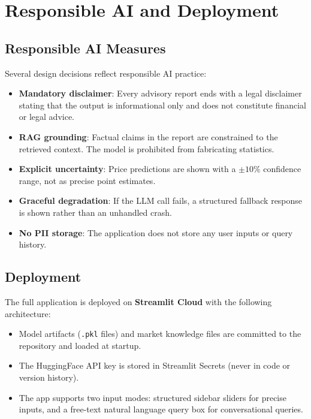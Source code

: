 \documentclass[12pt, a4paper]{article}
\begin{document}
\section{Responsible AI and Deployment}

\subsection{Responsible AI Measures}

Several design decisions reflect responsible AI practice:

\begin{itemize}[leftmargin=1.4em]
  \item \textbf{Mandatory disclaimer}: Every advisory report ends with a legal
        disclaimer stating that the output is informational only and does not
        constitute financial or legal advice.
  \item \textbf{RAG grounding}: Factual claims in the report are constrained to
        the retrieved context. The model is prohibited from fabricating statistics.
  \item \textbf{Explicit uncertainty}: Price predictions are shown with a
        $\pm 10\%$ confidence range, not as precise point estimates.
  \item \textbf{Graceful degradation}: If the LLM call fails, a structured fallback
        response is shown rather than an unhandled crash.
  \item \textbf{No PII storage}: The application does not store any user inputs
        or query history.
\end{itemize}

\subsection{Deployment}

The full application is deployed on \textbf{Streamlit Cloud} with the following
architecture:
\begin{itemize}[leftmargin=1.4em]
  \item Model artifacts (\texttt{.pkl} files) and market knowledge files are
        committed to the repository and loaded at startup.
  \item The HuggingFace API key is stored in Streamlit Secrets (never in code or
        version history).
  \item The app supports two input modes: structured sidebar sliders for precise
        inputs, and a free-text natural language query box for conversational queries.
\end{itemize}
\end{document}

